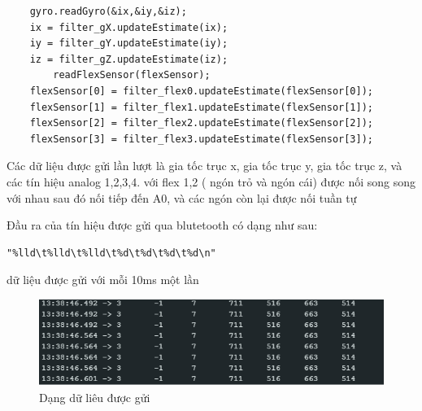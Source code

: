 \begin{lstlisting}
    gyro.readGyro(&ix,&iy,&iz); 
    ix = filter_gX.updateEstimate(ix);
    iy = filter_gY.updateEstimate(iy);
    iz = filter_gZ.updateEstimate(iz);
        readFlexSensor(flexSensor);
    flexSensor[0] = filter_flex0.updateEstimate(flexSensor[0]);
    flexSensor[1] = filter_flex1.updateEstimate(flexSensor[1]);
    flexSensor[2] = filter_flex2.updateEstimate(flexSensor[2]);
    flexSensor[3] = filter_flex3.updateEstimate(flexSensor[3]);
\end{lstlisting}

Các dữ liệu được gửi lần lượt là gia tốc trục x, gia tốc trục y, gia tốc trục z, và các tín hiệu analog 1,2,3,4. với flex 1,2 ( ngón trỏ và ngón cái) được nối song song với nhau sau đó nối tiếp đến A0, và các ngón còn lại được nối tuần tự

Đầu ra của tín hiệu được gửi qua blutetooth có dạng như sau: 
\begin{lstlisting}
"%lld\t%lld\t%lld\t%d\t%d\t%d\t%d\n"
\end{lstlisting}
 
dữ liệu được gửi với mỗi 10ms một lần

\begin{figure}[H]
    \centering
    \includegraphics[width=\textwidth,height=\textheight,keepaspectratio]{Images/SystemImpl/data.png}
    \caption{Dạng dữ liêu được gửi}
    \label{fig:enter-label}
\end{figure}

